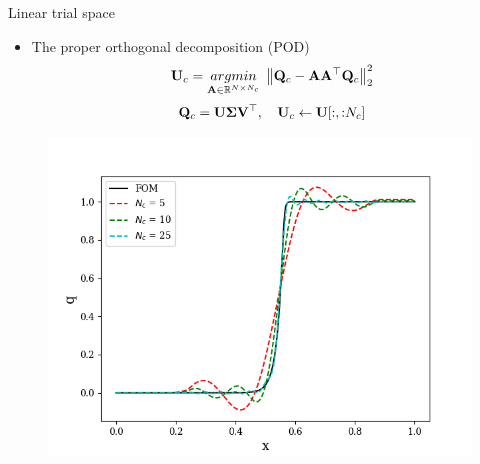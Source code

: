 \documentclass[]{beamer}
\begin{document}
\begin{frame}{Linear trial space}
    \begin{itemize}
        \item The proper orthogonal decomposition (POD)\footnotemark[1]
        \begin{equation*}
            \consTrial = \argmin{\dummyMatOne \in \mathbb{R}^{\numDOF \times \numConsModes}} \norm{\consDataMat - \dummyMatOne \dummyMatOne^\top \consDataMat}_2^2
        \end{equation*}
        \begin{equation*}
            \consDataMat = \basisMat \singVecMat \rightSingVecMat^\top, \quad \consTrial \leftarrow \basisMat[:, {:}\numConsModes]
        \end{equation*}
    \end{itemize}
	\centering
	\vspace{-0.8em}
	\begin{figure}
		\includegraphics[width=0.5\linewidth]{theory/podProfileConverge.png}
	\end{figure}
\end{frame}
\end{document}

